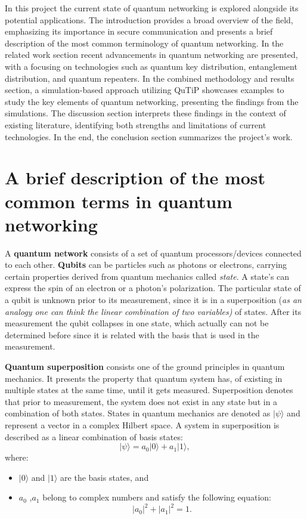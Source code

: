 \documentclass[12pt,a4paper] {report}
\begin{document}
		In this project the current state of quantum networking is explored alongside its potential applications. 
		The introduction provides a broad overview of the field, emphasizing its importance in secure communication and presents a brief
		description of the most common terminology of quantum networking.	
		In the related work section recent advancements in quantum networking are presented, with a focusing on technologies such as 
		quantum key distribution, entanglement distribution, and quantum repeaters. 
		In the combined methodology and results section, a simulation-based approach utilizing QuTiP 
		showcases examples to study the key elements of quantum networking, presenting the findings from the simulations.
		The discussion section interprets these findings in the context of existing literature, 
		identifying both strengths and limitations of current technologies. 
		In the end, the conclusion section summarizes the project's work.


		\section{A brief description of the most common terms in quantum networking}

		A \textbf{quantum network} consists of a set of quantum processors/devices connected to each other. \textbf{Qubits} can be particles such as photons
		or electrons, carrying certain properties derived from quantum mechanics called \textit{state}. A state's can express the spin of an electron or
		a photon's polarization. The particular state of a qubit is unknown prior to its measurement, since it is in a 
		superposition (\textit{as an analogy one can think the linear combination of two variables)} of states.
		After its measurement the qubit collapses in one state, which actually can not be determined
		before since it is related with the basis that is used in the measurement.
		
		\textbf{Quantum superposition} consists one of the ground principles in quantum mechanics. 
		It presents the property that quantum system has, of existing in multiple states at the same time, until it gets measured. 
		Superposition denotes that prior to measurement, the system does not exist in any state but in a combination of both states.
		States in quantum mechanics are denoted as $|\psi\rangle$ and represent a vector in a complex Hilbert space. 
		A system in superposition is described as a linear combination of basis states:
			\[
			|\psi\rangle = a_0 |0\rangle + a_1 |1\rangle,
			\]
		where:
		\begin{itemize}
			\item $|0\rangle$ and $|1\rangle$ are the basis states, and
			\item $a_0$ ,$a_1$ belong to complex numbers and satisfy the following equation:
			\[
			|a_0|^2 + |a_1|^2 = 1.
			\]
		\end{itemize}
\end{document}
